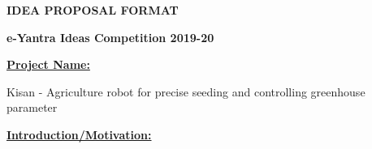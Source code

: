 \documentclass[12pt]{article}
\begin{document}
\begin{adjustwidth}{0.5in}{0.52in}
\begin{Center}
{\fontsize{18pt}{21.6pt}\selectfont \textbf{IDEA PROPOSAL FORMAT}\par}
\end{Center}\par

\end{adjustwidth}

\setlength{\parskip}{8.04pt}
\begin{adjustwidth}{0.5in}{0.52in}
\begin{Center}
{\fontsize{18pt}{21.6pt}\selectfont \textbf{e-Yantra Ideas Competition 2019-20}\par}
\end{Center}\par

\end{adjustwidth}

\begin{adjustwidth}{0.5in}{0.52in}
{\fontsize{14pt}{16.8pt}\selectfont \textbf{\uline{Project Name:}}\par}\tab \par

\end{adjustwidth}

\begin{adjustwidth}{0.5in}{0.52in}
Kisan - Agriculture robot for precise seeding and controlling greenhouse parameter\par

\end{adjustwidth}

\begin{adjustwidth}{0.5in}{0.52in}
{\fontsize{14pt}{16.8pt}\selectfont \textbf{\uline{Introduction/Motivation:}}\par}\par

\end{adjustwidth}
\end{document}
